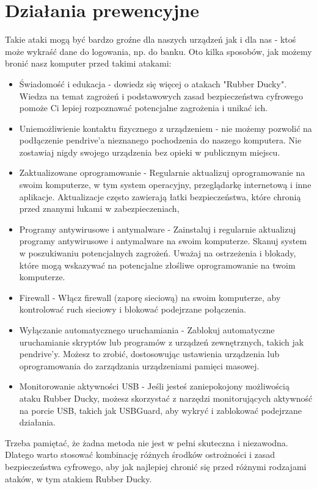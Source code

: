 \documentclass{article}
\begin{document}
\section{Działania prewencyjne}

Takie ataki mogą być bardzo groźne dla naszych urządzeń jak i dla nas - ktoś może wykraść dane do logowania, np. do banku.
Oto kilka sposobów, jak możemy bronić nasz komputer przed takimi atakami:
\begin{itemize}
    \item Świadomość i edukacja - dowiedz się więcej o atakach "Rubber Ducky". Wiedza na temat zagrożeń i podstawowych zasad bezpieczeństwa cyfrowego pomoże Ci lepiej rozpoznawać potencjalne zagrożenia i unikać ich.
    \item Uniemożliwienie kontaktu fizycznego z urządzeniem - nie możemy pozwolić na podłączenie pendrive'a nieznanego pochodzenia do naszego komputera. Nie zostawiaj nigdy swojego urządzenia bez opieki w publicznym miejscu.
    \item Zaktualizowane oprogramowanie - Regularnie aktualizuj oprogramowanie na swoim komputerze, w tym system operacyjny, przeglądarkę internetową i inne aplikacje. Aktualizacje często zawierają łatki bezpieczeństwa, które chronią przed znanymi lukami w zabezpieczeniach,
    \item Programy antywirusowe i antymalware - Zainstaluj i regularnie aktualizuj programy antywirusowe i antymalware na swoim komputerze. Skanuj system w poszukiwaniu potencjalnych zagrożeń. Uważaj na ostrzeżenia i blokady, które mogą wskazywać na potencjalne złośliwe oprogramowanie na twoim komputerze.
    \item Firewall - Włącz firewall (zaporę sieciową) na swoim komputerze, aby kontrolować ruch sieciowy i blokować podejrzane połączenia.
    \item Wyłączanie automatycznego uruchamiania - Zablokuj automatyczne uruchamianie skryptów lub programów z urządzeń zewnętrznych, takich jak pendrive'y. Możesz to zrobić, dostosowując ustawienia urządzenia lub oprogramowania do zarządzania urządzeniami pamięci masowej.
    \item Monitorowanie aktywności USB - Jeśli jesteś zaniepokojony możliwością ataku Rubber Ducky, możesz skorzystać z narzędzi monitorujących aktywność na porcie USB, takich jak USBGuard, aby wykryć i zablokować podejrzane działania.
\end{itemize}

Trzeba pamiętać, że żadna metoda nie jest w pełni skuteczna i niezawodna. Dlatego warto stosować kombinację różnych środków ostrożności i zasad bezpieczeństwa cyfrowego, aby jak najlepiej chronić się przed różnymi rodzajami ataków, w tym atakiem Rubber Ducky.
\end{document}
